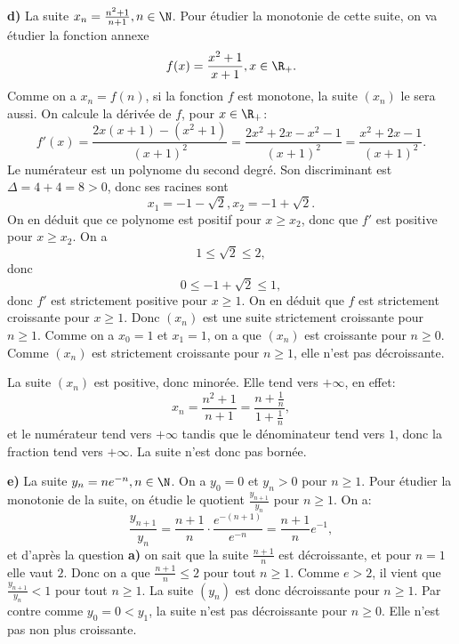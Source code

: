 \documentclass[12pt, a4paper,oneside]{article} %
\begin{document}
\textbf{d)}
La suite
$ x_{n} = \frac{n^{2} + 1}{n + 1}, n \in \N $.
Pour étudier la monotonie de cette suite,
on va étudier la fonction annexe
\begin{equation}
	f(x) = \frac{x^{2} +1}{x+1}
	,
	x \in \R_{+}.
\end{equation}
Comme on a $ x_{n} = f(n) $,
si la fonction $ f $
est monotone,
la suite $ (x_{n}) $
le sera aussi.
On calcule la dérivée de $ f $,
pour $ x \in \R_{+} $:
\begin{equation}
	f'(x)=
	\frac{2x(x+1) - (x^2+1)}{(x+1)^{2} }
	=
	\frac{2x^2+2x-x^2-1}{(x+1)^2}
	=
	\frac{x^2+2x-1}{(x+1)^{2}}
	.
\end{equation}
Le numérateur est un polynome du second
degré.
Son discriminant
est
$ \Delta = 4 + 4 = 8 > 0 $,
donc ses racines sont
\begin{equation}
	x_{1} 
	= -1-\sqrt{2}
		,
	x_{2}  
	= -1+\sqrt{2}
	.
\end{equation}
On en déduit que ce polynome
est positif pour
$ x \ge x_{2} $,
donc que $ f' $
est positive
pour $ x \ge x_{2} $.
On a
\begin{equation}
	1 \le \sqrt{2} \le 2
	,
\end{equation}
donc
\begin{equation}
	0 \le -1 + \sqrt{2} \le 1
	,
\end{equation}
donc $ f' $ est strictement
positive
pour $ x \ge 1 $.
On en déduit que $ f $
est strictement croissante
pour $ x \ge 1 $.
Donc $ (x_{n}) $
est une suite strictement croissante
pour $ n \ge 1 $.
Comme on a $ x_{0} = 1 $
et $ x_{1} =1 $,
on a que $ (x_{n}) $
est croissante pour
$ n \ge 0 $.
Comme $ (x_{n}) $
est strictement croissante
pour $ n \ge 1 $,
elle n'est pas décroissante.

La suite $ (x_n) $
est positive, donc minorée.
Elle tend vers $ +\infty $,
en effet:
\begin{equation}
	x_{n}=
	\frac{n^{2} +1}{n+1}
	=
	\frac{n + \frac{1}{n} }{1 + \frac{1}{n}}
	,
\end{equation}
et le numérateur tend vers $ +\infty $
tandis que le dénominateur tend vers $ 1 $,
donc la fraction tend vers $ +\infty $.
La suite n'est donc pas bornée.

\textbf{e)}
La suite
$ y_{n} = n e^{-n}, n \in \N $.
On a $ y_{0} = 0 $
et $ y_{n} > 0 $
pour
$ n \ge 1 $.
Pour étudier la monotonie de
la suite, on étudie le
quotient $ \frac{y_{n+1} }{y_{n} } $
pour $ n \ge 1 $.
On a:
\begin{equation}
	\frac{y_{n+1} }{y_{n} }
	=
	\frac{n+1}{n}
	\cdot
	\frac{e^{-(n+1)} }{e^{-n} }
	=
	\frac{n+1}{n}
	e^{-1}
	,
\end{equation}
et d'après la question
\textbf{a)}
on sait que la suite
$ \frac{n+1}{n} $
est décroissante,
et pour $ n=1 $
elle vaut
$ 2 $.
Donc on a que
$ \frac{n+1}{n} \le 2 $
pour tout $ n \ge 1 $.
Comme $ e > 2 $,
il vient que $ \frac{y_{n+1} }{y_{n} } < 1 $
pour tout $ n \ge 1 $.
La suite $ (y_n) $ est donc
décroissante pour $ n \ge 1 $.
Par contre comme
$ y_{0} = 0 < y_{1} $,
la suite n'est pas décroissante
pour $ n \ge 0 $.
Elle n'est pas non plus croissante.
\end{document}
